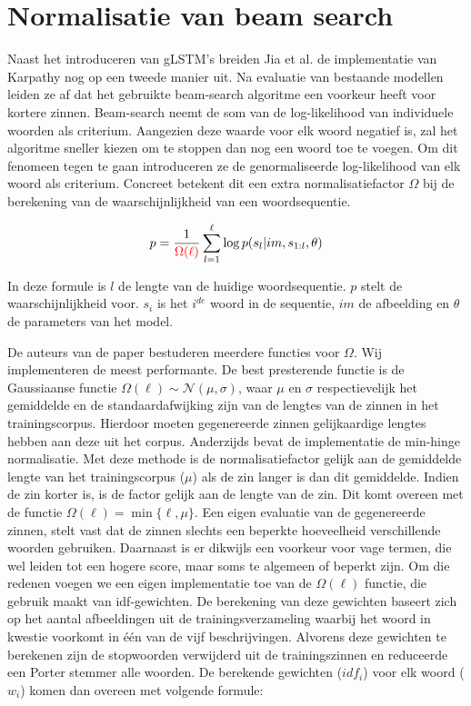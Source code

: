 \section{Normalisatie van beam search}
Naast het introduceren van gLSTM's breiden Jia et al.\cite{Fernando2015} de implementatie van Karpathy nog op een tweede manier uit. Na evaluatie van bestaande modellen leiden ze af dat het gebruikte beam-search algoritme een voorkeur heeft voor kortere zinnen. Beam-search neemt de som van de log-likelihood van individuele woorden als criterium. Aangezien deze waarde voor elk woord negatief is, zal het algoritme sneller kiezen om te stoppen dan nog een woord toe te voegen. Om dit fenomeen tegen te gaan introduceren ze de genormaliseerde log-likelihood van elk woord als criterium. Concreet betekent dit een extra normalisatiefactor $\Omega$ bij de berekening van de waarschijnlijkheid van een woordsequentie.

\begin{equation}
p = \frac{1}{\color{red}{\Omega(\ell)}}\sum_{l=1}^{\ell} \log p(s_l | im, s_{1:l}, \theta)
\label{eq:log-sentence-norm}
\end{equation}

In deze formule is $l$ de lengte van de huidige woordsequentie. $p$ stelt de waarschijnlijkheid voor. $s_i$ is het $i^{de}$ woord in de sequentie, $im$ de afbeelding en $\theta$ de parameters van het model. 

De auteurs van de paper bestuderen meerdere functies voor $\Omega$. Wij implementeren de meest performante.
De best presterende functie is de Gaussiaanse functie $\Omega(\ell) \sim \mathcal{N}(\mu, \sigma)$, waar $\mu$ en $\sigma$ respectievelijk het gemiddelde en de standaardafwijking zijn van de lengtes van de zinnen in het trainingscorpus. Hierdoor moeten gegenereerde zinnen gelijkaardige lengtes hebben aan deze uit het corpus. 
Anderzijds bevat de implementatie de min-hinge normalisatie. Met deze methode is de normalisatiefactor gelijk aan de gemiddelde lengte van het trainingscorpus ($\mu$) als de zin langer is dan dit gemiddelde. Indien de zin korter is, is de factor gelijk aan de lengte van de zin. Dit komt overeen met de functie $\Omega(\ell)=\min\{\ell, \mu\}$.
Een eigen evaluatie van de gegenereerde zinnen, stelt vast dat de zinnen slechts een beperkte hoeveelheid verschillende woorden gebruiken. Daarnaast is er dikwijls een voorkeur voor vage termen, die wel leiden tot een hogere score, maar soms te algemeen of beperkt zijn.
Om die redenen voegen we een eigen implementatie toe van de $\Omega(\ell)$ functie, die gebruik maakt van idf-gewichten. De berekening van deze gewichten baseert zich op het aantal afbeeldingen uit de trainingsverzameling waarbij het woord in kwestie voorkomt in \'e\'en van de vijf beschrijvingen. Alvorens deze gewichten te berekenen zijn de stopwoorden verwijderd uit de trainingszinnen en reduceerde een Porter stemmer alle woorden. De berekende gewichten ($idf_i$) voor elk woord ($w_i$) komen dan overeen met volgende formule: 

